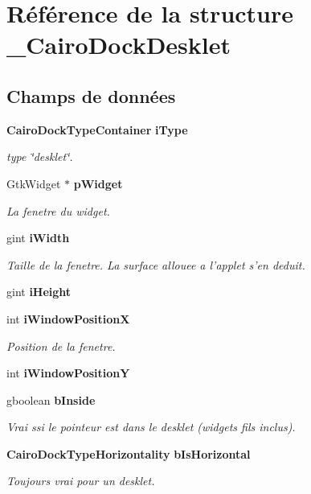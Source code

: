 \section{Référence de la structure \_\-CairoDockDesklet}
\label{struct__CairoDockDesklet}
\subsection*{Champs de données}
\begin{CompactItemize}
\item 
{\bf CairoDockTypeContainer} {\bf iType}
\begin{CompactList}\small\item\em type \char`\"{}desklet\char`\"{}. \item\end{CompactList}\item 
GtkWidget $\ast$ {\bf pWidget}
\begin{CompactList}\small\item\em La fenetre du widget. \item\end{CompactList}\item 
gint {\bf iWidth}
\begin{CompactList}\small\item\em Taille de la fenetre. La surface allouee a l'applet s'en deduit. \item\end{CompactList}\item 
gint {\bf iHeight}
\item 
int {\bf iWindowPositionX}
\begin{CompactList}\small\item\em Position de la fenetre. \item\end{CompactList}\item 
int {\bf iWindowPositionY}
\item 
gboolean {\bf bInside}
\begin{CompactList}\small\item\em Vrai ssi le pointeur est dans le desklet (widgets fils inclus). \item\end{CompactList}\item 
{\bf CairoDockTypeHorizontality} {\bf bIsHorizontal}
\begin{CompactList}\small\item\em Toujours vrai pour un desklet. \item\end{CompactList}\item 

\end{CompactItemize}
